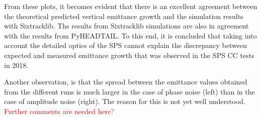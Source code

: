 From these plots, it becomes evident that there is an excellent agreement between the theoretical predicted vertical emittance growth and the simulation results with Sixtracklib. Ths results from Sixtracklib simulations are also in agreement with the results from PyHEADTAIL. To this end, it is concluded that taking into account the detailed optics of the SPS cannot explain the discrepancy between expected and measured emittance growth that was observed in the SPS CC tests in 2018.

Another observation, is that the spread between the emittance values obtained from the different runs is much larger in the case of phase noise (left) than in the case of amplitude noise (right). The reason for this is not yet well understood. \textcolor{red}{Further comments are needed here?}


